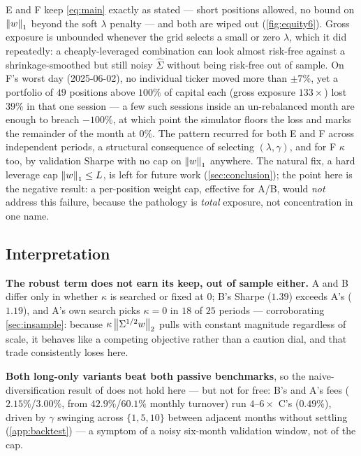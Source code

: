 E and F keep \cref{eq:main} exactly as stated --- short positions allowed, no bound on
$\left\lVert w \right\rVert_1$ beyond the soft $\lambda$ penalty --- and both are wiped out (\cref{fig:equity6}).
Gross exposure is unbounded whenever the grid selects a small or zero $\lambda$, which it did
repeatedly: a cheaply-leveraged combination can look almost risk-free against a shrinkage-smoothed
but still noisy $\hat\Sigma$ without being risk-free out of sample. On F's worst day (2025-06-02),
no individual ticker moved more than $\pm7\%$, yet a portfolio of $49$ positions above $100\%$ of
capital each (gross exposure $133\times$) lost $39\%$ in that one session --- a few such sessions
inside an un-rebalanced month are enough to breach $-100\%$, at which point the simulator floors
the loss and marks the remainder of the month at $0\%$. The pattern recurred for both E and F
across independent periods, a structural consequence of selecting $(\lambda,\gamma)$, and for F
$\kappa$ too, by validation Sharpe with no cap on $\left\lVert w \right\rVert_1$ anywhere. The natural fix, a hard
leverage cap $\left\lVert w \right\rVert_1\le L$, is left for future work (\cref{sec:conclusion}); the point here is
the negative result: a per-position weight cap, effective for A/B, would \emph{not} address this
failure, because the pathology is \emph{total} exposure, not concentration in one name.

\subsection{Interpretation}\label{sec:interpretation}

\textbf{The robust term does not earn its keep, out of sample either.} A and B differ only in
whether $\kappa$ is searched or fixed at $0$; B's Sharpe ($1.39$) exceeds A's ($1.19$), and A's own
search picks $\kappa=0$ in $18$ of $25$ periods --- corroborating \cref{sec:insample}: because
$\kappa\left\lVert \Sigma^{1/2} w \right\rVert_2$ pulls with constant magnitude regardless of scale, it behaves like a
competing objective rather than a caution dial, and that trade consistently loses here.

\textbf{Both long-only variants beat both passive benchmarks}, so the naive-diversification result
of \citet{demiguel2009} does not hold here --- but not for free: B's and A's fees
($2.15\%$/$3.00\%$, from $42.9\%$/$60.1\%$ monthly turnover) run $4$--$6\times$ C's ($0.49\%$),
driven by $\gamma$ swinging across $\{1,5,10\}$ between adjacent months without settling
(\cref{app:backtest}) --- a symptom of a noisy six-month validation window, not of the cap.


